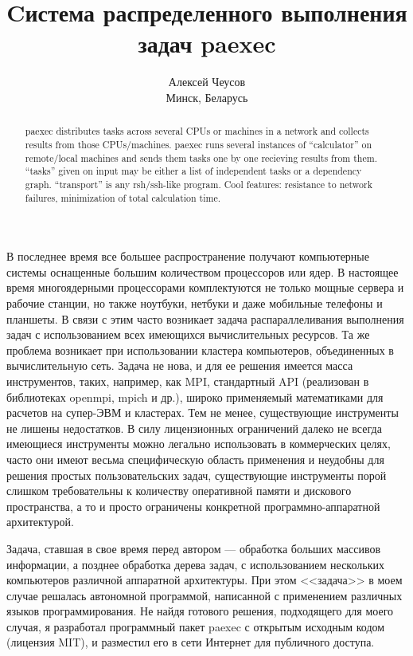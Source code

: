 \documentclass[10pt, a5paper]{article}
\begin{document}
\title{Cистема распределенного выполнения задач paexec }
\author{Алексей Чеусов\\
\small Минск, Беларусь}
\def\progref!#1!{\texttt{#1}}

\maketitle

\begin{abstract}paexec distributes tasks across several CPUs or machines in a
network and collects results from those CPUs/machines. paexec runs
several instances of ``calculator'' on remote/local machines and sends
them tasks one by one recieving results from them. ``tasks'' given on
input may be either a list of independent tasks or a dependency
graph. ``transport'' is any rsh/ssh-like program. Cool features:
resistance to network failures, minimization of total calculation
time.
\end{abstract}

В последнее время все большее распространение получают компьютерные
системы оснащенные большим количеством процессоров или ядер.  В
настоящее время многоядерными процессорами комплектуются не только
мощные сервера и рабочие станции, но также ноутбуки, нетбуки и
даже мобильные телефоны и планшеты. В связи с этим часто возникает
задача распараллеливания выполнения задач с использованием всех
имеющихся вычислительных ресурсов. Та же проблема возникает при
использовании кластера компьютеров, объединенных в вычислительную
сеть. Задача не нова, и для ее решения имеется масса инструментов,
таких, например, как MPI, стандартный API (реализован в библиотеках
openmpi, mpich и др.), широко применяемый математиками для расчетов на
супер-ЭВМ и кластерах.  Тем не менее, существующие инструменты не
лишены недостатков.  В силу лицензионных ограничений далеко не всегда
имеющиеся инструменты можно легально использовать в коммерческих
целях, часто они имеют весьма специфическую область применения и
неудобны для решения простых пользовательских задач, существующие
инструменты порой слишком требовательны к количеству оперативной
памяти и дискового пространства, а то и просто ограничены конкретной
программно-аппаратной архитектурой.

Задача, ставшая в свое время перед автором --- обработка больших
массивов информации, а позднее обработка дерева задач, с
использованием нескольких компьютеров различной аппаратной
архитектуры. При этом <<задача>> в моем случае решалась автономной
программой, написанной с применением различных языков
программирования. Не найдя готового решения, подходящего для моего
случая, я разработал программный пакет paexec с открытым исходным
кодом (лицензия MIT), и разместил его в сети Интернет для публичного
доступа.
\end{document}
